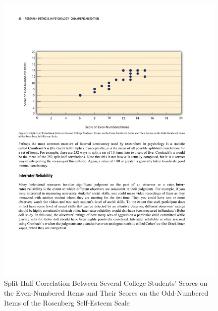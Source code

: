 \begin{figure}



      \includegraphics[width=\linewidth]{figures/C5internal.pdf}



      \caption{Split-Half Correlation Between Several College Students' Scores on the Even-Numbered Items and Their Scores on the Odd-Numbered Items of the Rosenberg Self-Esteem Scale}



      \label{fig:testretest}



\end{figure}

